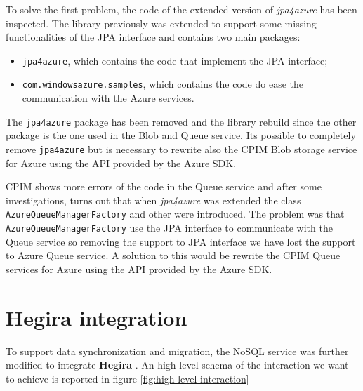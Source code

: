 \noindent To solve the first problem, the code of the extended version of \textit{jpa4azure} has been inspected. The library previously  was extended to support some missing functionalities of the JPA interface and contains two main packages:
\begin{itemize}
\item \texttt{jpa4azure}, which contains the code that implement the JPA interface;
\item \texttt{com.windowsazure.samples}, which contains the code do ease the communication with the Azure services.
\end{itemize}
The \texttt{jpa4azure} package has been removed and the library rebuild since the other package is the one used in the Blob and Queue service. Its possible to completely remove \texttt{jpa4azure} but is necessary to rewrite also the CPIM Blob storage service for Azure using the API provided by the Azure SDK.

\newparagraph CPIM shows more errors of the code in the Queue service and after some investigations, turns out that when \textit{jpa4azure} was extended the class \texttt{AzureQueueManagerFactory} and other were introduced.
The problem was that \texttt{AzureQueueManagerFactory} use the JPA interface to communicate with the Queue service so removing the support to JPA interface we have lost the support to Azure Queue service.
A solution to this would be rewrite the CPIM Queue services for Azure using the API provided by the Azure SDK.

\section{Hegira integration}
\label{sec:hegira}
To support data synchronization and migration, the NoSQL service was further modified to integrate \textbf{Hegira} \cite{thesis:marco}. An high level schema of the interaction we want to achieve is reported in figure \ref{fig:high-level-interaction}

